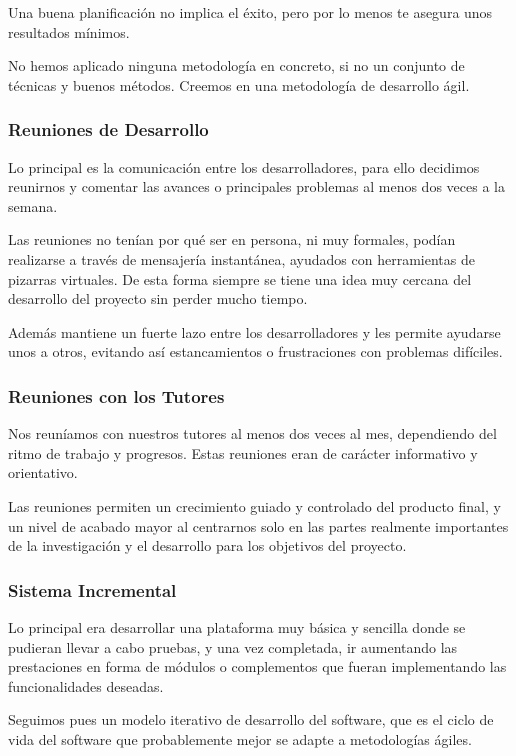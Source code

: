 Una buena planificación no implica el éxito, pero por lo menos te asegura unos
resultados mínimos.

No hemos aplicado ninguna metodología en concreto, si no un conjunto de técnicas
y buenos métodos. Creemos en una metodología de desarrollo ágil.

\subsubsection*{Reuniones de Desarrollo}

Lo principal es la comunicación entre los desarrolladores, para ello decidimos
reunirnos y comentar las avances o principales problemas al menos dos veces a
la semana.

Las reuniones no tenían por qué ser en persona, ni muy formales, podían
realizarse a través de mensajería instantánea, ayudados con herramientas de
pizarras virtuales. De esta forma siempre se tiene una idea muy cercana del
desarrollo del proyecto sin perder mucho tiempo.

Además mantiene un fuerte lazo entre los desarrolladores y les permite ayudarse
unos a otros, evitando así estancamientos o frustraciones con problemas
difíciles.

\subsubsection*{Reuniones con los Tutores}

Nos reuníamos con nuestros tutores al menos dos veces al mes, dependiendo del
ritmo de trabajo y progresos. Estas reuniones eran de carácter informativo y
orientativo.

Las reuniones permiten un crecimiento guiado y controlado del producto final, y
un nivel de acabado mayor al centrarnos solo en las partes realmente importantes
de la investigación y el desarrollo para los objetivos del proyecto.

\subsubsection*{Sistema Incremental}

Lo principal era desarrollar una plataforma muy básica y sencilla donde se
pudieran llevar a cabo pruebas, y una vez completada, ir aumentando las
prestaciones en forma de módulos o complementos que fueran implementando las
funcionalidades deseadas.

Seguimos pues un modelo iterativo de desarrollo del software, que es el ciclo
de vida del software que probablemente mejor se adapte a metodologías ágiles.

